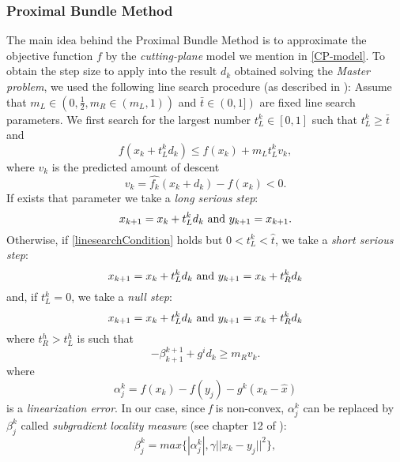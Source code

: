 \subsubsection{Proximal Bundle Method}
The main idea behind the Proximal Bundle Method is to approximate the objective function $f$ by the \textit{cutting-plane} model we mention in \ref{CP-model}. To obtain the step size to apply into the result $d_{k}$ obtained solving the \textit{Master problem}, we used the following line search procedure (as described in \cite{NonsmoothOPT}): 
Assume that $m_{L} \in (0, \frac{1}{2}, m_{R} \in (m_{L},1))$ \textnormal{ and } $ \bar{t} \in (0,1])$ are fixed line search parameters. We first search for the largest number $t_{L}^k \in [0,1]$ such that $t_{L}^k \geq \bar{t}$ and
\begin{equation}
\label{linesearchCondition}
f(x_{k}+t_{L}^k d_{k}) \leq f(x_{k}) + m_{L}t_{L}^k v_{k}, 
\end{equation}
where $v_{k}$ is the predicted amount of descent 
\begin{equation}
v_{k} = \hat{f_{k}}(x_{k}+d_{k}) - f(x_{k}) < 0.
\end{equation}
If exists that parameter we take a \textit{long serious step}:
\begin{equation}
x_{k+1} = x_{k} + t_{L}^k d_{k} \textnormal{ and } y_{k+1}= x_{k+1}.
\end{equation}
Otherwise, if \ref{linesearchCondition} holds but $0 < t_{L}^k < \hat{t}$, we take a \textit{short serious step}:
\begin{equation}
x_{k+1} = x_{k} + t_{L}^k d_{k} \textnormal{ and } y_{k+1}= x_{k}+t_{R}^k d_{k}
\end{equation} 
and, if $t_ {L}^k=0$, we take a \textit{null step}: 
\begin{equation}
x_{k+1} = x_{k} + t_{L}^k d_{k} \textnormal{ and } y_{k+1}= x_{k}+t_{R}^k  d_{k}
\end{equation}
where $t_{R}^h > t_{L}^h$ is such that 
\begin{equation}
- \beta_{k+1}^{k+1}+ g^i d_{k} \geq m_{R}v_{k}.
\end{equation}
where 
\begin{equation}
\alpha_{j}^k = f(x_{k}) - f(y_{j}) -g^k(x_{k}-\hat{x})
\end{equation}
is a \textit{linearization error}. In our case, since \textit{f} is non-convex, $\alpha_{j}^k$ can be replaced by $\beta_{j}^k$ called \textit{subgradient locality measure} (see chapter 12 of \cite{NonsmoothOPT}): 
\begin{equation}
\beta_{j}^k = max\{|\alpha_{j}^k|,\gamma || x_{k}-y_{j} ||^2\},
\end{equation}

